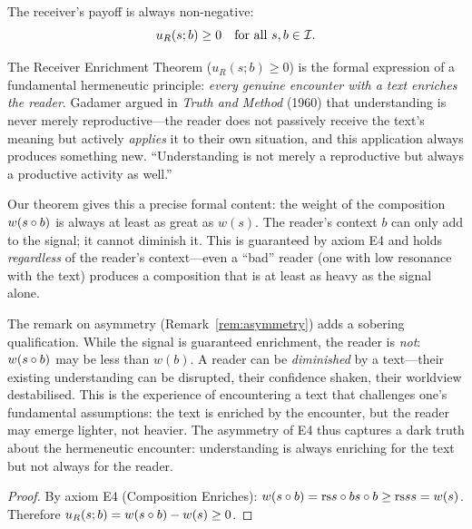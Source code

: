 \begin{theorem}
\label{thm:receiver-enrichment}
The receiver's payoff is always non-negative:
\[
  u_R(s; b) \geq 0 \quad \text{for all } s, b \in \mathcal{I}.
\]
\end{theorem}

\begin{interpretation}
\label{interp:ch13:receiver_enrichment_gadamer}
The Receiver Enrichment Theorem ($u_R(s; b) \geq 0$) is the formal
expression of a fundamental hermeneutic principle: \emph{every genuine
encounter with a text enriches the reader}.  Gadamer argued in \emph{Truth
and Method} (1960) that understanding is never merely reproductive---the
reader does not passively receive the text's meaning but actively
\emph{applies} it to their own situation, and this application always
produces something new.  ``Understanding is not merely a reproductive but
always a productive activity as well.''

Our theorem gives this a precise formal content: the weight of the
composition $w(s \circ b)$ is always at least as great as $w(s)$.  The
reader's context $b$ can only add to the signal; it cannot diminish it.
This is guaranteed by axiom E4 and holds \emph{regardless} of the reader's
context---even a ``bad'' reader (one with low resonance with the text)
produces a composition that is at least as heavy as the signal alone.

The remark on asymmetry (Remark~\ref{rem:asymmetry}) adds a sobering
qualification.  While the signal is guaranteed enrichment, the reader is
\emph{not}: $w(s \circ b)$ may be less than $w(b)$.  A reader can be
\emph{diminished} by a text---their existing understanding can be disrupted,
their confidence shaken, their worldview destabilised.  This is the
experience of encountering a text that challenges one's fundamental
assumptions: the text is enriched by the encounter, but the reader may
emerge lighter, not heavier.  The asymmetry of E4 thus captures a dark
truth about the hermeneutic encounter: understanding is always enriching
for the text but not always for the reader.
\end{interpretation}



\begin{proof}
By axiom E4 (Composition Enriches):
$w(s \circ b) = \mathrm{rs}{s \circ b}{s \circ b} \geq \mathrm{rs}{s}{s} = w(s)$.
Therefore $u_R(s; b) = w(s \circ b) - w(s) \geq 0$.
\end{proof}

